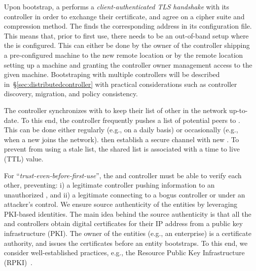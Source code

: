 Upon bootstrap, a \tp performs a \textit{client-authenticated TLS handshake} with its
controller in order to exchange their certificate, and agree on a cipher suite and compression
method. The \tp finds the corresponding address in its configuration file. This means
that, prior to first use, there needs to be an out-of-band setup where the \tp is
configured. This can either be done by the owner of the controller shipping a pre-configured
machine to the new remote location or by the remote location setting up a machine and
granting the controller owner management access to the given machine. Bootstraping \tps
with multiple controllers will be described in~\S\ref{sec:distributedcontroller} with
practical considerations such as controller discovery, \tp migration, and policy consistency.

The controller synchronizes with \tps to keep their list of other \tps in the network 
up-to-date. To this end, the controller frequently pushes a list of potential peers to \tps.
This can be done either regularly (e.g., on a daily basis) or occasionally
(e.g., when a new \tp joins the network).
\tps then establish a secure channel with new \tps. To prevent \tps from using a stale \tp list,
the shared \tp list is associated with a time to live (TTL) value. 

For ``\textit{trust-even-before-first-use}'', 
the \tps and controller must be able to verify each 
other, preventing: i) a legitimate controller pushing information to an unauthorized \tp, 
and ii) a legitimate \tp connecting to a bogus controller or \tp under an attacker's control.
We ensure source authenticity of the \name entities by leveraging PKI-based identities.
The main idea behind the source authenticity is that all the \tps and controllers obtain
digital certificates for their IP address from a public key infrastructure (PKI). The owner
of the entities (e.g., an enterprise) is a certificate authority, and issues the certificates
before an entity bootstraps. To this end, we consider well-established practices, e.g.,
the Resource Public Key Infrastructure (RPKI)~\cite{rfc7115,rfc6810}.


